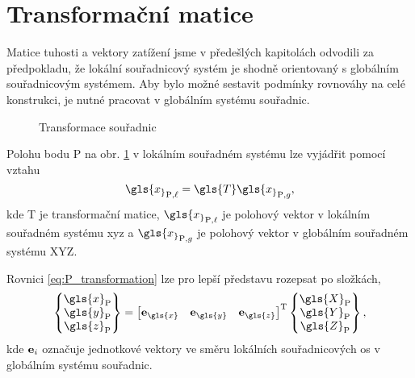 \section{Transformační matice}

Matice tuhosti a vektory zatížení jsme v předešlých kapitolách odvodili za předpokladu, že lokální souřadnicový systém je shodně orientovaný s globálním souřadnicovým systémem. Aby bylo možné sestavit podmínky rovnováhy na celé konstrukci, je nutné pracovat v globálním systému souřadnic.

\begin{figure}[H]
    
    \caption{Transformace souřadnic}
    \label{fig:coordinate_transformation}
\end{figure}

Polohu bodu $\mathrm{P}$ na obr. \ref{fig:coordinate_transformation} v lokálním souřadném systému lze vyjádřit pomocí vztahu
\begin{equation} \label{eq:P_transformation}
    \gls{x_}_{\mathrm{P},\ell} = \gls{T}  \gls{x_}_{\mathrm{P},g},
\end{equation}
kde \gls{T} je transformační matice, $\gls{x_}_{\mathrm{P},\ell}$ je polohový vektor v lokálním souřadném systému \gls{x}\gls{y}\gls{z} a $\gls{x_}_{\mathrm{P},g}$ je polohový vektor v globálním souřadném systému \gls{X}\gls{Y}\gls{Z}.

Rovnici \ref{eq:P_transformation} lze pro lepší představu rozepsat po složkách,
\begin{equation}
    \begin{Bmatrix}
        \gls{x}_{\mathrm{P}} \\
        \gls{y}_{\mathrm{P}} \\
        \gls{z}_{\mathrm{P}}
    \end{Bmatrix}
    =
    \begin{bmatrix}
        \matr{e}_{\gls{x}} &
        \matr{e}_{\gls{y}} &
        \matr{e}_{\gls{z}}
    \end{bmatrix}^{\mathrm{T}}
    \begin{Bmatrix}
        \gls{X}_{\mathrm{P}} \\
        \gls{Y}_{\mathrm{P}} \\
        \gls{Z}_{\mathrm{P}}
    \end{Bmatrix},
\end{equation}
kde $\mathbf{e}_i$ označuje jednotkové vektory ve směru lokálních souřadnicových os v globálním systému souřadnic.

